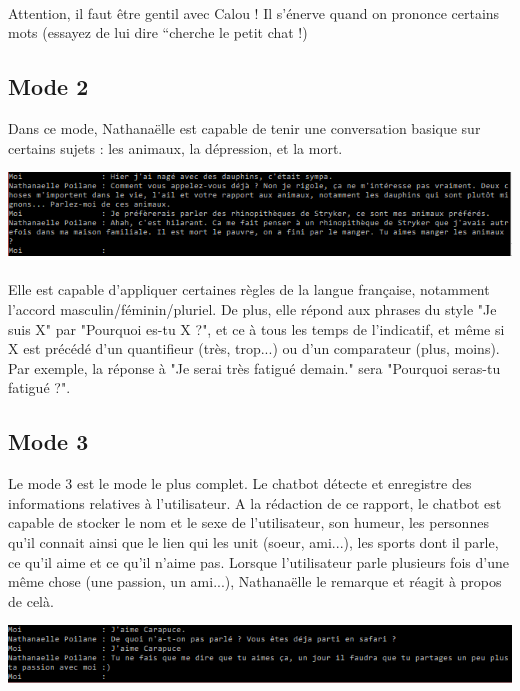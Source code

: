 \documentclass[paper=a4, fontsize=11pt]{article}
\begin{document}
\paragraph{} Attention, il faut être gentil avec Calou ! Il s'énerve quand on prononce certains mots (essayez de lui dire “cherche le petit chat !)

\subsection{Mode 2}

Dans ce mode, Nathanaëlle est capable de tenir une conversation basique sur certains sujets : les animaux, la dépression, et la mort. 

\begin{center}
\includegraphics{rhinopdauph.PNG}
\end{center}

\paragraph{} Elle est capable d'appliquer certaines règles de la langue française, notamment l'accord masculin/féminin/pluriel. De plus, elle répond aux phrases du style "Je suis X" par "Pourquoi es-tu X ?", et ce à tous les temps de l'indicatif, et même si X est précédé d'un quantifieur (très, trop...) ou d'un comparateur (plus, moins). Par exemple, la réponse à "Je serai très fatigué demain." sera "Pourquoi seras-tu fatigué ?".

\subsection{Mode 3}

Le mode 3 est le mode le plus complet. Le chatbot détecte et enregistre des informations relatives à l'utilisateur. A la rédaction de ce rapport, le chatbot est capable de stocker le nom et le sexe de l'utilisateur, son humeur, les personnes qu'il connait ainsi que le lien qui les unit (soeur, ami...), les sports dont il parle, ce qu'il aime et ce qu'il n'aime pas. Lorsque l'utilisateur parle plusieurs fois d'une même chose (une passion, un ami...), Nathanaëlle le remarque et réagit à propos de celà.
\begin{center}
\includegraphics{carapuce.PNG}
\end{center}
\end{document}

